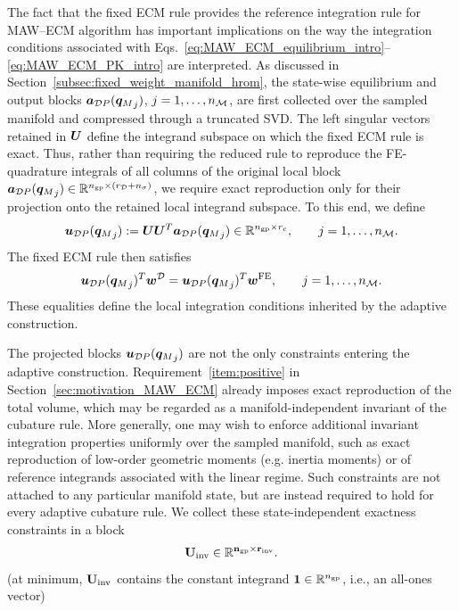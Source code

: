 \documentclass[11pt,a4paper]{article}
\begin{document}
The fact that the fixed ECM rule provides the reference integration rule for
  MAW--ECM algorithm   has important implications on the way
the integration conditions associated with
Eqs.~\eqref{eq:MAW_ECM_equilibrium_intro}--%
\eqref{eq:MAW_ECM_PK_intro} are interpreted.    As discussed in
Section~\ref{subsec:fixed_weight_manifold_hrom}, the state-wise equilibrium
and output blocks \(\bm{a}_{\mathcal{D}P}({\bm{q}_M}_j)\), \(j=1,\ldots,n_{\mathcal{M}}\), are first collected
over the sampled manifold and compressed through a truncated SVD. The left
singular vectors retained in \(\bm{U}\) define the integrand subspace on which
the fixed ECM rule is exact. Thus, rather than requiring the reduced rule to reproduce the FE-quadrature
integrals of all columns of the original local block
\(\bm{a}_{\mathcal{D}P}({\bm{q}_M}_j)\in\mathbb{R}^{n_{\mathrm{gp}}\times(r_{\mathcal{D}}+n_{\sigma})}\), we require exact
reproduction only for their projection onto the retained local integrand
subspace. To this end, we define
\begin{equation}
\label{eq:MAW_projected_local_block}
    \bm{u}_{\mathcal{D}P}({\bm{q}_M}_j)
    :=
    \bm{U}\bm{U}^T\bm{a}_{\mathcal{D}P}({\bm{q}_M}_j)
    \in
    \mathbb{R}^{n_{\mathrm{gp}}\times r_c},
    \qquad
    j=1,\ldots,n_{\mathcal{M}} .
\end{equation}
The fixed ECM rule then satisfies
\begin{equation}
\label{eq:MAW_fixed_rule_local_exactness}
    \bm{u}_{\mathcal{D}P}({\bm{q}_M}_j)^T\bm{w}^{\mathcal{D}}
    =
    \bm{u}_{\mathcal{D}P}({\bm{q}_M}_j)^T\bm{w}^{\mathrm{FE}},
    \qquad
    j=1,\ldots,n_{\mathcal{M}} .
\end{equation}
These equalities define the local integration conditions inherited by the
adaptive construction.


The projected blocks \(\bm{u}_{\mathcal{D}P}({\bm{q}_M}_j)\) are not the only constraints entering
the adaptive construction. Requirement~\ref{item:positive} in
Section~\ref{sec:motivation_MAW_ECM} already imposes exact reproduction of the
total volume, which may be regarded as a manifold-independent invariant of the
cubature rule. More generally, one may wish to enforce additional invariant
integration properties uniformly over the sampled manifold, such as exact reproduction of low-order geometric moments (e.g. inertia moments) or of reference integrands associated with the
 linear regime.   Such constraints are not
attached to any particular manifold state, but are instead required to hold for
every adaptive cubature rule.  We collect these state-independent exactness constraints in a block
\[
    \bf{U}_{\mathrm{inv}}\in\mathbb{R}^{n_{\mathrm{gp}}\times r_{\mathrm{inv}}}.
\]
(at minimum, \(\bf{U}_{\mathrm{inv}}\) contains the constant integrand
\(\bm{1}\in\mathbb{R}^{n_{\mathrm{gp}}}\), i.e., an all-ones vector)
\end{document}
